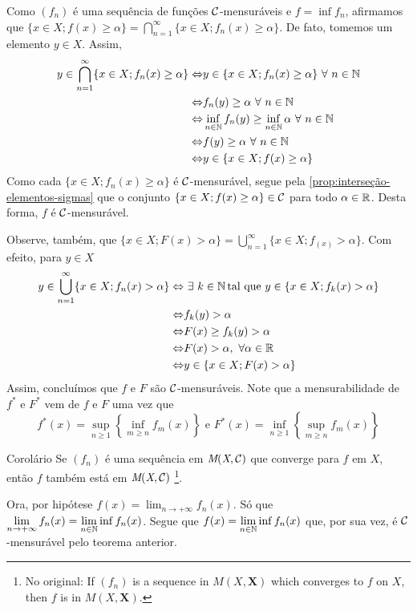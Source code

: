 \begin{prova}
	Como $(f_n)$ é uma sequência de funções $\operatorname{\mathcal{C}}$-mensuráveis e $f = \inf f_n$, afirmamos que $\{x \in X; f(x) \geq \alpha\} = \displaystyle \bigcap_{n = 1}^\infty \{x \in X; f_n(x) \geq \alpha\}$.
	De fato, tomemos um elemento $y \in X$.
	Assim, 
		\begin{align*}
			y \in \bigcap_{n = 1}^\infty \{x \in X; f_n(x) \geq \alpha\} \Leftrightarrow	&
			y \in \{x \in X; f_n(x) \geq \alpha\}\ \forall\  n \in \N\\
			\Leftrightarrow	&	
			f_n(y) \geq \alpha\ \forall \ n \in \N\\
			\Leftrightarrow	&	
			\inf_{n \in \N}f_n(y) \geq \inf_{n \in \N}\alpha\ \forall \ n \in \N\\
			\Leftrightarrow	&	
			f(y) \geq \alpha\ \forall\  n \in \N\\
			\Leftrightarrow	&
			y \in \{x \in X; f(x) \geq \alpha\}
		\end{align*}
	Como cada $\{x \in X; f_n(x) \geq \alpha\}$ é $\operatorname{\mathcal{C}}$-mensurável, segue pela \ref{prop:interseção-elementos-sigmas} que o conjunto $\{x \in X; f(x) \geq \alpha\} \in \operatorname{\mathcal{C}}$ para todo $\alpha \in \mathbb{R}$.
	Desta forma, $f$ é $\operatorname{\mathcal{C}}$-mensurável.
	
	Observe, também, que $\{x \in X; F(x) >\alpha\} = \displaystyle \bigcup_{n = 1}^\infty \{x \in X; f_(x) >\alpha\}$.
	Com efeito, para $y \in X$ 
	\begin{align*}
		y \in \bigcup_{n = 1}^\infty \{x \in X; f_n(x) > \alpha\} \Leftrightarrow	&
		\ \exists\ k \in \operatorname{\mathbb{N}} \textrm{tal que\ } y \in \{x \in X; f_k(x) > \alpha\}\\
		\Leftrightarrow	&	
		f_k(y) > \alpha\\
		\Leftrightarrow	&	
		F(x) \geq f_k(y) > \alpha\\
		\Leftrightarrow	&	
		F(x) > \alpha,\ \forall \alpha \in \mathbb{R}\\
		\Leftrightarrow	&
		y \in \{x \in X; F(x) > \alpha\}
	\end{align*}
	Assim, concluímos que $f$ e $F$ são $\operatorname{\mathcal{C}}$-mensuráveis. 
	Note que a mensurabilidade de $f^*$ e $F^*$ vem de $f$ e $F$ uma vez que
	$$
	f^*(x) = \sup_{n \geq 1} \left\{\inf_{m \geq n} f_m(x)\right\}
	\textrm{\ e\ }
	F^*(x) = \inf_{n \geq 1} \left\{\sup_{m \geq n} f_m(x)\right\}
	$$
\end{prova}
\begin{env}{Corolário}
	\label{cor:convergencia-de-uma-sequencia-mensuravel}
	Se $(f_n)$ é uma sequência em $\operatorname{\textit{M}(\textit{X}, \mathcal{C} )}$ que converge para $f$ em $X$, então
	$f$ também está em $\operatorname{\textit{M}(\textit{X}, \mathcal{C} )}$
	\cite[p. 12, tradução nossa, adaptação nossa]{bartle}
	\footnote{No original:
		If $(f_n)$ is a sequence in $M(X, \textbf{X})$ which converges to $f$ on $X$, 
		then $f$ is in $M(X, \textbf{X})$.
	}.
	
\end{env}
\begin{prova}
	Ora, por hipótese $\displaystyle f(x) = \lim_{n \to +\infty} f_n(x)$.
	Só que $\displaystyle \lim_{n \to +\infty} f_n(x) = \lim_{n \in \operatorname{\mathbb{N}}} \inf f_n(x)$.
	Segue que $\displaystyle f(x) = \lim_{n \in \operatorname{\mathbb{N}}} \inf f_n(x)$ que, por sua vez, é $\operatorname{\mathcal{C}}$-mensurável pelo teorema anterior.
\end{prova}

